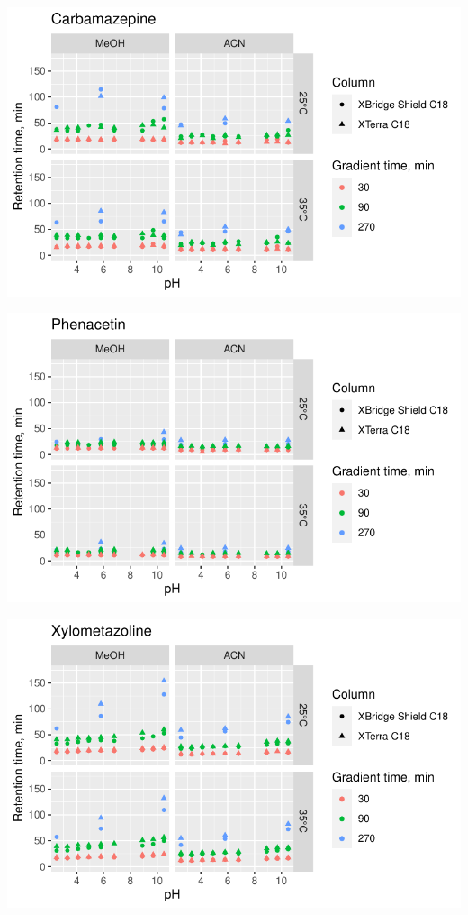 \documentclass[
  letterpaper,
  DIV=11,
  numbers=noendperiod]{scrreprt}
\begin{document}
\includegraphics{index_files/figure-pdf/unnamed-chunk-4-9.pdf}

\includegraphics{index_files/figure-pdf/unnamed-chunk-4-10.pdf}

\includegraphics{index_files/figure-pdf/unnamed-chunk-4-11.pdf}
\end{document}
